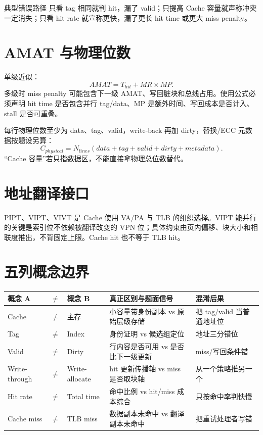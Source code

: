 \documentclass[UTF8,fontset=fandol,11pt,a4paper]{ctexart}
\begin{document}
\begin{warnbox}{典型错误路径}
只看 tag 相同就判 hit，漏了 valid；只提高 Cache 容量就声称冲突一定消失；只看 hit rate 就宣称更快，漏了更长 hit time 或更大 miss penalty。
\end{warnbox}

\section{AMAT 与物理位数}
单级近似：
\[
AMAT=T_{hit}+MR\times MP.
\]
多级时 miss penalty 可能包含下一级 AMAT、写回脏块和总线占用。使用公式必须声明 hit time 是否包含并行 tag/data、MP 是额外时间、写回成本是否计入、stall 是否可重叠。

每行物理位数至少为 data、tag、valid，write-back 再加 dirty，替换/ECC 元数据按题设另算：
\[
C_{physical}=N_{lines}(data+tag+valid+dirty+metadata).
\]
“Cache 容量”若只指数据区，不能直接拿物理总位数替代。

\section{地址翻译接口}
PIPT、VIPT、VIVT 是 Cache 使用 VA/PA 与 TLB 的组织选择。VIPT 能并行的关键是索引位不依赖被翻译改变的 VPN 位；具体约束由页内偏移、块大小和相联度推出，不背固定上限。Cache hit 也不等于 TLB hit。

\section{五列概念边界}
\begin{center}\small\begin{tabularx}{\linewidth}{L{1.7cm}C{0.35cm}L{1.7cm}Y Y}\toprule
概念 A & $\neq$ & 概念 B & 真正区别与题面信号 & 混淆后果\\\midrule
Cache & $\neq$ & 主存 & 小容量带身份副本 vs 原始层级存储 & 把 tag/valid 当普通地址位\\
Tag & $\neq$ & Index & 身份证明 vs 候选组定位 & 地址三分错位\\
Valid & $\neq$ & Dirty & 行内容是否可用 vs 是否比下一级更新 & miss/写回条件错\\
Write-through & $\neq$ & Write-allocate & hit 更新传播轴 vs miss 是否取块轴 & 从一个策略推另一个\\
Hit rate & $\neq$ & Total time & 命中比例 vs hit/miss 成本综合 & 只按命中率判快慢\\
Cache miss & $\neq$ & TLB miss & 数据副本未命中 vs 翻译副本未命中 & 把重试处理者写错\\
\bottomrule\end{tabularx}\end{center}
\end{document}
